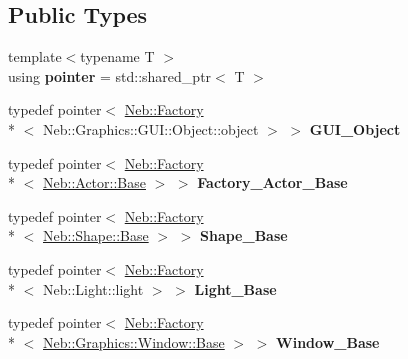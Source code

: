 \subsection*{Public Types}
\begin{DoxyCompactItemize}
\item 
\hypertarget{classNeb_1_1App_1_1BaseFactory_ae1a3d2b340c951c6a1167dfae3bd1f82}{{\footnotesize template$<$typename T $>$ }\\using {\bfseries pointer} = std\-::shared\-\_\-ptr$<$ T $>$}\label{classNeb_1_1App_1_1BaseFactory_ae1a3d2b340c951c6a1167dfae3bd1f82}

\item 
\hypertarget{classNeb_1_1App_1_1BaseFactory_ae5eda71ec076fd45d462e905fe3863c0}{typedef pointer$<$ \hyperlink{classNeb_1_1Factory}{Neb\-::\-Factory}\\*
$<$ Neb\-::\-Graphics\-::\-G\-U\-I\-::\-Object\-::object $>$ $>$ {\bfseries G\-U\-I\-\_\-\-Object}}\label{classNeb_1_1App_1_1BaseFactory_ae5eda71ec076fd45d462e905fe3863c0}

\item 
\hypertarget{classNeb_1_1App_1_1BaseFactory_adb13eef681dd64d83bd14d29adcab67c}{typedef pointer$<$ \hyperlink{classNeb_1_1Factory}{Neb\-::\-Factory}\\*
$<$ \hyperlink{classNeb_1_1Actor_1_1Base}{Neb\-::\-Actor\-::\-Base} $>$ $>$ {\bfseries Factory\-\_\-\-Actor\-\_\-\-Base}}\label{classNeb_1_1App_1_1BaseFactory_adb13eef681dd64d83bd14d29adcab67c}

\item 
\hypertarget{classNeb_1_1App_1_1BaseFactory_ad68d4c2c4834639335124a003e34b37c}{typedef pointer$<$ \hyperlink{classNeb_1_1Factory}{Neb\-::\-Factory}\\*
$<$ \hyperlink{classNeb_1_1Shape_1_1Base}{Neb\-::\-Shape\-::\-Base} $>$ $>$ {\bfseries Shape\-\_\-\-Base}}\label{classNeb_1_1App_1_1BaseFactory_ad68d4c2c4834639335124a003e34b37c}

\item 
\hypertarget{classNeb_1_1App_1_1BaseFactory_ad77d1d1ba2072913470814fa00f7639c}{typedef pointer$<$ \hyperlink{classNeb_1_1Factory}{Neb\-::\-Factory}\\*
$<$ Neb\-::\-Light\-::light $>$ $>$ {\bfseries Light\-\_\-\-Base}}\label{classNeb_1_1App_1_1BaseFactory_ad77d1d1ba2072913470814fa00f7639c}

\item 
\hypertarget{classNeb_1_1App_1_1BaseFactory_a2e1133c47fbc9aec044fe8b98ea33d21}{typedef pointer$<$ \hyperlink{classNeb_1_1Factory}{Neb\-::\-Factory}\\*
$<$ \hyperlink{classNeb_1_1Graphics_1_1Window_1_1Base}{Neb\-::\-Graphics\-::\-Window\-::\-Base} $>$ $>$ {\bfseries Window\-\_\-\-Base}}\label{classNeb_1_1App_1_1BaseFactory_a2e1133c47fbc9aec044fe8b98ea33d21}


\end{DoxyCompactItemize}
